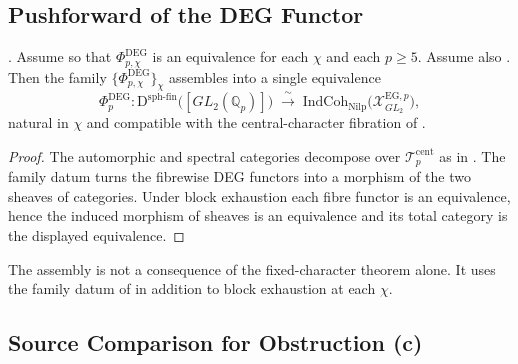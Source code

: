 \subsection{Pushforward of the DEG Functor}

\begin{theorem}
\label{v4-arith:deg-f1a:thm:central-character-variation}
\ClaimStatusProvedHereConditional. Assume
 so that
\(\Phi^{\mathrm{DEG}}_{p,\chi}\) is an equivalence for each \(\chi\)
and each \(p\geq 5\).  Assume also
. Then the family
\(\{\Phi^{\mathrm{DEG}}_{p,\chi}\}_{\chi}\) assembles into a single
equivalence
\begin{equation}
\label{v4-arith:deg-f1a:eq:varying-chi}
\Phi^{\mathrm{DEG}}_{p}\colon\mathrm{D}^{\mathrm{sph\text{-}fin}}\bigl([GL_{2}(\mathbb{Q}_{p})]\bigr)
\;\xrightarrow{\;\sim\;}\;\mathrm{IndCoh}_{\mathrm{Nilp}}\bigl(\mathcal{X}^{\mathrm{EG},p}_{GL_{2}}\bigr),
\end{equation}
natural in \(\chi\) and compatible with the central-character fibration
of .
\end{theorem}

\begin{proof}
The automorphic and spectral categories decompose over
\(\mathcal{T}^{\mathrm{cent}}_{p}\) as in
.  The family datum
turns the fibrewise DEG functors into a morphism of the two sheaves
of categories.  Under block exhaustion each fibre functor is an
equivalence, hence the induced morphism of sheaves is an equivalence
and its total category is the displayed equivalence.
\end{proof}

\begin{remark}
\label{v4-arith:deg-f1a:rem:fixed-vs-varying}
The assembly
 is
not a consequence of the fixed-character theorem alone.  It uses the
family datum of
 in addition to
block exhaustion at each \(\chi\).
\end{remark}

\subsection{Source Comparison for Obstruction (c)}

